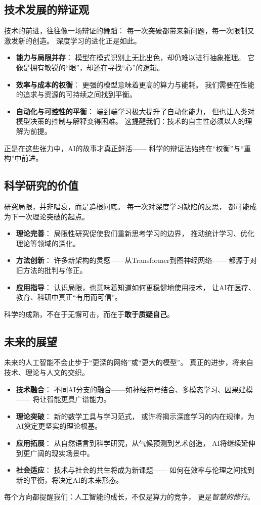 \subsection{技术发展的辩证观}  
技术的前进，往往像一场辩证的舞蹈：  
每一次突破都带来新问题，每一次限制又激发新的创造。  
深度学习的进化正是如此。  
\begin{itemize}
\item \textbf{能力与局限并存}：  
  模型在模式识别上无比出色，却仍难以进行抽象推理。  
  它像是拥有敏锐的“眼”，却还在寻找“心”的逻辑。  

\item \textbf{效率与成本的权衡}：  
  更强的模型意味着更高的算力与能耗。  
  我们需要在性能的追求与资源的可持续之间找到平衡。  

\item \textbf{自动化与可控性的平衡}：  
  端到端学习极大提升了自动化能力，  
  但也让人类对模型决策的控制与解释变得困难。  
  这提醒我们：技术的自主性必须以人的理解为前提。  
\end{itemize}
正是在这些张力中，AI的故事才真正鲜活——  
科学的辩证法始终在“权衡”与“重构”中前进。

\subsection{科学研究的价值}  
研究局限，并非唱衰，而是追根问底。  
每一次对深度学习缺陷的反思，  
都可能成为下一次理论突破的起点。  
\begin{itemize}
\item \textbf{理论完善}：  
  局限性研究促使我们重新思考学习的边界，  
  推动统计学习、优化理论等领域的深化。  
\item \textbf{方法创新}：  
  许多新架构的灵感——从Transformer到图神经网络——  
  都源于对旧方法的批判与修正。  
\item \textbf{应用指导}：  
  认识局限，也意味着知道如何更稳健地使用技术，  
  让AI在医疗、教育、科研中真正“有用而可信”。  
\end{itemize}
科学的成熟，不在于无懈可击，而在于\textbf{敢于质疑自己}。  

\subsection{未来的展望}  
未来的人工智能不会止步于“更深的网络”或“更大的模型”。  
真正的进步，将来自技术、理论与人文的交织。  
\begin{itemize}
\item \textbf{技术融合}：  
  不同AI分支的融合——如神经符号结合、多模态学习、因果建模——  
  将让智能更具广谱能力。  
\item \textbf{理论突破}：  
  新的数学工具与学习范式，  
  或许将揭示深度学习的内在规律，为AI奠定更坚实的理论根基。  
\item \textbf{应用拓展}：  
  从自然语言到科学研究，从气候预测到艺术创造，  
  AI将继续延伸到更广阔的现实场景中。  
\item \textbf{社会适应}：  
  技术与社会的共生将成为新课题——  
  如何在效率与伦理之间找到新的平衡，将决定AI的未来形态。  
\end{itemize}
每个方向都提醒我们：人工智能的成长，不仅是算力的竞争，  
更是\textit{智慧的修行}。

